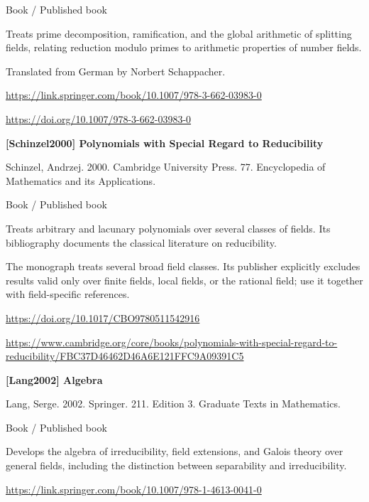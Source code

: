 \documentclass[11pt,a4paper,oneside,openany]{book}
\begin{document}
{\small\sffamily\color{atlasgold}Book / Published book}\par
\color{black} Treats prime decomposition, ramification, and the global arithmetic of splitting fields, relating reduction modulo primes to arithmetic properties of number fields.\par
{\small Translated from German by Norbert Schappacher.}\par
{\footnotesize\url{https://link.springer.com/book/10.1007/978-3-662-03983-0}}\par
{\footnotesize\url{https://doi.org/10.1007/978-3-662-03983-0}}\par
\vspace{9pt}
\hypertarget{ref:Schinzel2000}{}
{\sffamily\bfseries\color{atlasgreen}[Schinzel2000] Polynomials with Special Regard to Reducibility}\par
\color{black} Schinzel, Andrzej. 2000. Cambridge University Press. 77. Encyclopedia of Mathematics and its Applications.\par
{\small\sffamily\color{atlasgold}Book / Published book}\par
\color{black} Treats arbitrary and lacunary polynomials over several classes of fields. Its bibliography documents the classical literature on reducibility.\par
{\small The monograph treats several broad field classes. Its publisher explicitly excludes results valid only over finite fields, local fields, or the rational field; use it together with field-specific references.}\par
{\footnotesize\url{https://doi.org/10.1017/CBO9780511542916}}\par
{\footnotesize\url{https://www.cambridge.org/core/books/polynomials-with-special-regard-to-reducibility/FBC37D46462D46A6E121FFC9A09391C5}}\par
\vspace{9pt}
\hypertarget{ref:Lang2002}{}
{\sffamily\bfseries\color{atlasgreen}[Lang2002] Algebra}\par
\color{black} Lang, Serge. 2002. Springer. 211. Edition 3. Graduate Texts in Mathematics.\par
{\small\sffamily\color{atlasgold}Book / Published book}\par
\color{black} Develops the algebra of irreducibility, field extensions, and Galois theory over general fields, including the distinction between separability and irreducibility.\par
{\footnotesize\url{https://link.springer.com/book/10.1007/978-1-4613-0041-0}}\par
\end{document}
